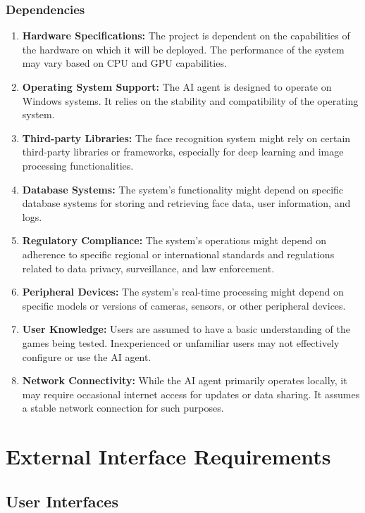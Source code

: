 \documentclass{scrreprt}
\begin{document}
        \subsection{Dependencies}
            \begin{enumerate}
                \item \textbf{Hardware Specifications:} The project is dependent on the capabilities of the hardware on which it will be deployed. The performance of the system may vary based on CPU and GPU capabilities.
                \item \textbf{Operating System Support:} The AI agent is designed to operate on Windows systems. It relies on the stability and compatibility of the operating system.
                \item \textbf{Third-party Libraries:} The face recognition system might rely on certain third-party libraries or frameworks, especially for deep learning and image processing functionalities.
                \item \textbf{Database Systems:} The system's functionality might depend on specific database systems for storing and retrieving face data, user information, and logs.
                \item \textbf{Regulatory Compliance:} The system's operations might depend on adherence to specific regional or international standards and regulations related to data privacy, surveillance, and law enforcement.
                \item \textbf{Peripheral Devices:} The system's real-time processing might depend on specific models or versions of cameras, sensors, or other peripheral devices.
                \item \textbf{User Knowledge:} Users are assumed to have a basic understanding of the games being tested. Inexperienced or unfamiliar users may not effectively configure or use the AI agent.
                \item \textbf{Network Connectivity:} While the AI agent primarily operates locally, it may require occasional internet access for updates or data sharing. It assumes a stable network connection for such purposes.
            \end{enumerate}


\chapter{External Interface Requirements}
    \section{User Interfaces}
\end{document}
